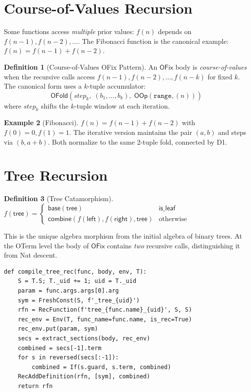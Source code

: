 \documentclass[11pt,a4paper]{report}
\theoremstyle{definition}
\newtheorem{definition}{Definition}[chapter]
\newtheorem{example}[definition]{Example}
\theoremstyle{plain}
\begin{document}
\section{Course-of-Values Recursion}

Some functions access \emph{multiple} prior values: $f(n)$ depends on
$f(n{-}1), f(n{-}2), \ldots$.  The Fibonacci function is the canonical
example: $f(n) = f(n{-}1) + f(n{-}2)$.

\begin{definition}[Course-of-Values OFix Pattern]
An $\mathsf{OFix}$ body is \emph{course-of-values} when the recursive
calls access $f(n{-}1), f(n{-}2), \ldots, f(n{-}k)$ for fixed $k$.
The canonical form uses a $k$-tuple accumulator:
\[
  \mathsf{OFold}(\mathit{step}_k,\;
  (b_1, \ldots, b_k),\;
  \mathsf{OOp}(\texttt{range}, (n)))
\]
where $\mathit{step}_k$ shifts the $k$-tuple window at each iteration.
\end{definition}

\begin{example}[Fibonacci]
$f(n) = f(n{-}1) + f(n{-}2)$ with $f(0)=0, f(1)=1$.  The iterative
version maintains the pair $(a,b)$ and steps via $(b, a{+}b)$.  Both
normalize to the same 2-tuple fold, connected by D1.
\end{example}

\section{Tree Recursion}

\begin{definition}[Tree Catamorphism]
$f(\mathsf{tree}) = \begin{cases}
\mathsf{base}(\mathsf{tree}) & \mathsf{is\_leaf} \\
\mathsf{combine}(f(\mathsf{left}), f(\mathsf{right}), \mathsf{tree})
  & \text{otherwise}
\end{cases}$

This is the unique algebra morphism from the initial algebra of
binary trees.  At the OTerm level the body of $\mathsf{OFix}$ contains
\emph{two} recursive calls, distinguishing it from Nat descent.
\end{definition}

\begin{lstlisting}[caption={Tree recursion Z3 encoding}]
def compile_tree_rec(func, body, env, T):
    S = T.S; T._uid += 1; uid = T._uid
    param = func.args.args[0].arg
    sym = FreshConst(S, f'_tree_{uid}')
    rfn = RecFunction(f'tree_{func.name}_{uid}', S, S)
    rec_env = Env(T, func_name=func.name, is_rec=True)
    rec_env.put(param, sym)
    secs = extract_sections(body, rec_env)
    combined = secs[-1].term
    for s in reversed(secs[:-1]):
        combined = If(s.guard, s.term, combined)
    RecAddDefinition(rfn, [sym], combined)
    return rfn
\end{lstlisting}
\end{document}
